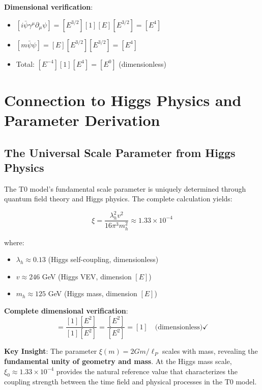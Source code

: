 \documentclass[12pt,a4paper]{article}
\theoremstyle{definition}
\theoremstyle{remark}
\begin{document}
	\textbf{Dimensional verification}:
	\begin{itemize}
		\item $[i\bar{\psi}\gamma^\mu\partial_\mu\psi] = [E^{3/2}][1][E][E^{3/2}] = [E^4]$
		\item $[m\bar{\psi}\psi] = [E][E^{3/2}][E^{3/2}] = [E^4]$
		\item Total: $[E^{-4}][1][E^4] = [E^0]$ (dimensionless) \checkmark
	\end{itemize}
	
	\section{Connection to Higgs Physics and Parameter Derivation}
	\label{sec:higgs_parameter_connection}
	
	\subsection{The Universal Scale Parameter from Higgs Physics}
	\label{subsec:universal_scale_parameter}
	
	The T0 model's fundamental scale parameter is uniquely determined through quantum field theory and Higgs physics. The complete calculation yields:
	
	\begin{equation}
		\boxed{\xi = \frac{\lambda_h^2 v^2}{16\pi^3 m_h^2} \approx 1.33 \times 10^{-4}}
		\label{eq:xi_higgs_universal}
	\end{equation}
	
	where:
	\begin{itemize}
		\item $\lambda_h \approx 0.13$ (Higgs self-coupling, dimensionless)
		\item $v \approx 246$ GeV (Higgs VEV, dimension $[E]$)
		\item $m_h \approx 125$ GeV (Higgs mass, dimension $[E]$)
	\end{itemize}
	
	\textbf{Complete dimensional verification}:
	\begin{equation}
		[\xi] = \frac{[1][E^2]}{[1][E^2]} = \frac{[E^2]}{[E^2]} = [1] \quad \text{(dimensionless)} \checkmark
	\end{equation}
	
\begin{tcolorbox}[colback=green!5!white,colframe=green!75!black,title=Universal Scale Parameter]
	\textbf{Key Insight}: The parameter $\xi(m) = 2Gm/\ell_P$ scales with mass, revealing the \textbf{fundamental unity of geometry and mass}. At the Higgs mass scale, $\xi_0 \approx 1.33 \times 10^{-4}$ provides the natural reference value that characterizes the coupling strength between the time field and physical processes in the T0 model.
\end{tcolorbox}
	
\end{document}

